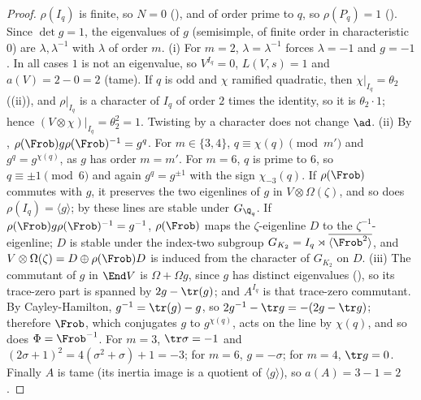 \begin{proof}
$\rho(I_q)$ is finite, so $N=0$ (), and of order prime to $q$, so $\rho(P_q)=1$ (). Since $\det g=1$, the
eigenvalues of $g$ (semisimple, of finite order in characteristic $0$) are $\lambda,\lambda^{-1}$ with $\lambda$ of order $m$. (i) For $m=2$, $\lambda=\lambda^{-1}$ forces $\lambda=-1$
and $g=-1$. In all cases $1$ is not an eigenvalue, so $V^{I_q}=0$, $L(V,s)=1$ and $a(V)=2-0=2$ (tame). If $q$ is odd and $\chi$ ramified quadratic, then
$\chi|_{I_q}=\theta_2$ ((ii)), and $\rho|_{I_q}$ is a character of $I_q$ of order $2$ times the identity, so it is $\theta_2\cdot1$; hence
$(V\otimes\chi)|_{I_q}=\theta_2^2=1$. Twisting by a character does not change $\ad$. (ii) By ,
$\rho(\Frob)g\rho(\Frob)^{-1}=g^q$. For $m\in\{3,4\}$, $q\equiv\chi(q)\pmod{m'}$ and $g^q=g^{\chi(q)}$, as $g$ has order $m=m'$. For $m=6$, $q$ is prime to $6$, so $q\equiv\pm1\pmod6$ and
again $g^q=g^{\pm1}$ with the sign $\chi_{-3}(q)$. If $\rho(\Frob)$ commutes with $g$, it preserves the two eigenlines of $g$ in $V\otimes\Omega(\zeta)$, and so does $\rho(I_q)=\langle g\rangle$;
by  these lines are stable under $G_{\Q_q}$. If $\rho(\Frob)g\rho(\Frob)^{-1}=g^{-1}$, $\rho(\Frob)$ maps the $\zeta$-eigenline $D$ to the $\zeta^{-1}$-eigenline;
$D$ is stable under the index-two subgroup $G_{K_2}=I_q\rtimes\overline{\langle\Frob^2\rangle}$, and $V\otimes\Omega(\zeta)=D\oplus\rho(\Frob)D$ is induced from the character of $G_{K_2}$ on
$D$. (iii) The commutant of $g$ in $\End V$ is $\Omega+\Omega g$, since $g$ has distinct eigenvalues (), so its trace-zero part is spanned by
$2g-\tr(g)$; and $A^{I_q}$ is that trace-zero commutant. By Cayley-Hamilton, $g^{-1}=\tr(g)-g$, so $2g^{-1}-\tr g=-(2g-\tr g)$; therefore $\Frob$, which conjugates
$g$ to $g^{\chi(q)}$, acts on the line by $\chi(q)$, and so does $\Phi=\Frob^{-1}$. For $m=3$, $\tr\sigma=-1$ and $(2\sigma+1)^2=4(\sigma^2+\sigma)+1=-3$; for $m=6$,
$g=-\sigma$; for $m=4$, $\tr g=0$. Finally $A$ is tame (its inertia image is a quotient of $\langle g\rangle$), so $a(A)=3-1=2$.
\end{proof}

